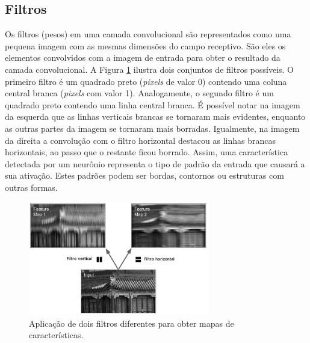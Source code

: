 \subsection{Filtros}
Os filtros (pesos) em uma camada convolucional são representados como uma pequena
imagem com as mesmas dimensões do campo receptivo. São eles os elementos
convolvidos com a imagem de entrada para obter o resultado da camada convolucional.
A Figura \ref{fig:conv_filt} ilustra dois conjuntos de filtros possíveis. O primeiro filtro é um quadrado preto
(\textit{pixels} de valor 0) contendo uma coluna central branca (\textit{pixels} com valor 1). 
Analogamente, o segundo filtro é um quadrado preto contendo uma linha central branca.
É possível notar na imagem da esquerda que as linhas verticais brancas se tornaram mais
evidentes, enquanto as outras partes da imagem se tornaram mais borradas. Igualmente, na imagem da direita 
a convolução com o filtro horizontal destacou as linhas brancas horizontais, ao passo que
o restante ficou borrado. Assim, uma característica detectada por um neurônio representa
o tipo de padrão da entrada que causará a sua ativação.
Estes padrões podem ser bordas, contornos ou estruturas com outras formas.
\begin{figure}[htp]
\begin{center}
  \includegraphics[width=0.7\textwidth]{fig/conv_filt}
  \caption{Aplicação de dois filtros diferentes para obter mapas de características.}
  \label{fig:conv_filt}
\end{center}
\end{figure}

